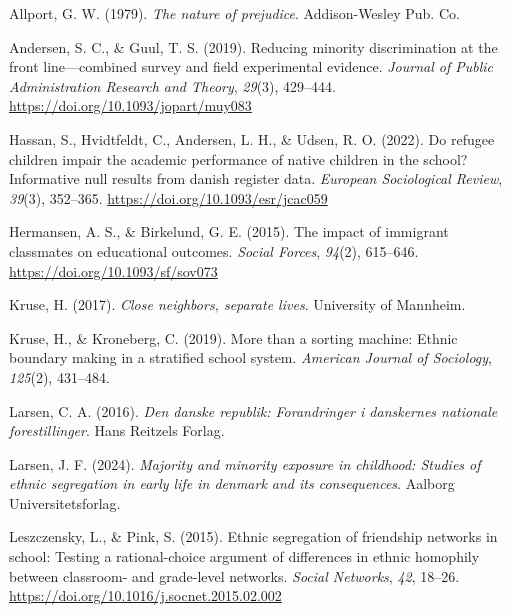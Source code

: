 \documentclass[
]{book}
\newlength{\cslhangindent}
\newlength{\cslentryspacingunit} %
\newenvironment{CSLReferences}[2] %
 {%
  \setlength{\parindent}{0pt}
  \ifodd #1
  \let\oldpar\par
  \def\par{\hangindent=\cslhangindent\oldpar}
  \fi
  \setlength{\parskip}{#2\cslentryspacingunit}
 }%
 {}
\begin{document}
\hypertarget{refs}{}
\begin{CSLReferences}{1}{0}
\leavevmode{}%
Allport, G. W. (1979). \emph{The nature of prejudice}. Addison-Wesley Pub. Co.

\leavevmode{}%
Andersen, S. C., \& Guul, T. S. (2019). Reducing minority discrimination at the front line---combined survey and field experimental evidence. \emph{Journal of Public Administration Research and Theory}, \emph{29}(3), 429--444. \url{https://doi.org/10.1093/jopart/muy083}

\leavevmode{}%
Hassan, S., Hvidtfeldt, C., Andersen, L. H., \& Udsen, R. O. (2022). Do refugee children impair the academic performance of native children in the school? Informative null results from danish register data. \emph{European Sociological Review}, \emph{39}(3), 352--365. \url{https://doi.org/10.1093/esr/jcac059}

\leavevmode{}%
Hermansen, A. S., \& Birkelund, G. E. (2015). The impact of immigrant classmates on educational outcomes. \emph{Social Forces}, \emph{94}(2), 615--646. \url{https://doi.org/10.1093/sf/sov073}

\leavevmode{}%
Kruse, H. (2017). \emph{Close neighbors, separate lives}. University of Mannheim.

\leavevmode{}%
Kruse, H., \& Kroneberg, C. (2019). More than a sorting machine: Ethnic boundary making in a stratified school system. \emph{American Journal of Sociology}, \emph{125}(2), 431--484.

\leavevmode{}%
Larsen, C. A. (2016). \emph{Den danske republik: Forandringer i danskernes nationale forestillinger}. Hans Reitzels Forlag.

\leavevmode{}%
Larsen, J. F. (2024). \emph{Majority and minority exposure in childhood: Studies of ethnic segregation in early life in denmark and its consequences}. Aalborg Universitetsforlag.

\leavevmode{}%
Leszczensky, L., \& Pink, S. (2015). Ethnic segregation of friendship networks in school: Testing a rational-choice argument of differences in ethnic homophily between classroom- and grade-level networks. \emph{Social Networks}, \emph{42}, 18--26. \url{https://doi.org/10.1016/j.socnet.2015.02.002}


\end{CSLReferences}
\end{document}
